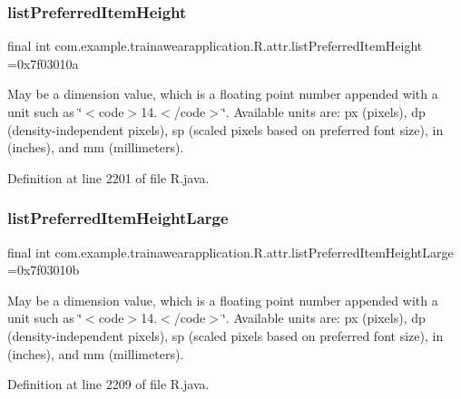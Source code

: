 \subsubsection{\texorpdfstring{listPreferredItemHeight}{listPreferredItemHeight}}
{\footnotesize\ttfamily final int com.\+example.\+trainawearapplication.\+R.\+attr.\+list\+Preferred\+Item\+Height =0x7f03010a\hspace{0.3cm}{\ttfamily [static]}}

May be a dimension value, which is a floating point number appended with a unit such as \char`\"{}$<$code$>$14.\+5sp$<$/code$>$\char`\"{}. Available units are\+: px (pixels), dp (density-\/independent pixels), sp (scaled pixels based on preferred font size), in (inches), and mm (millimeters). 

Definition at line 2201 of file R.\+java.

\mbox{\label{classcom_1_1example_1_1trainawearapplication_1_1_r_1_1attr_a1d042800aa57219351e0eaada5833ef4}} 
\subsubsection{\texorpdfstring{listPreferredItemHeightLarge}{listPreferredItemHeightLarge}}
{\footnotesize\ttfamily final int com.\+example.\+trainawearapplication.\+R.\+attr.\+list\+Preferred\+Item\+Height\+Large =0x7f03010b\hspace{0.3cm}{\ttfamily [static]}}

May be a dimension value, which is a floating point number appended with a unit such as \char`\"{}$<$code$>$14.\+5sp$<$/code$>$\char`\"{}. Available units are\+: px (pixels), dp (density-\/independent pixels), sp (scaled pixels based on preferred font size), in (inches), and mm (millimeters). 

Definition at line 2209 of file R.\+java.

\mbox{\label{classcom_1_1example_1_1trainawearapplication_1_1_r_1_1attr_a98188019936b3cd23163b19d8bae3a55}} 
